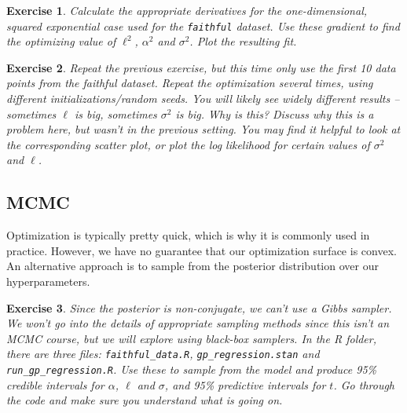 \documentclass[twoside]{article}
\newcounter{lecnum}
\newtheorem{exercise}{Exercise}[lecnum]
\begin{document}
 \begin{exercise}
   Calculate the appropriate derivatives for the one-dimensional, squared exponential case used for the \texttt{faithful} dataset. Use these gradient to find the optimizing value of $\ell^2$, $\alpha^2$ and $\sigma^2$. Plot the resulting fit.
 \end{exercise}


 \begin{exercise}
   Repeat the previous exercise, but this time only use the first 10 data points from the faithful dataset. Repeat the optimization several times, using different initializations/random seeds. You will likely see widely different results -- sometimes $\ell$ is big, sometimes $\sigma^2$ is big. Why is this? Discuss why this is a problem here, but wasn't in the previous setting. You may find it helpful to look at the corresponding scatter plot, or plot the log likelihood for certain values of $\sigma^2$ and $\ell$.
 \end{exercise}
 
 \subsection{MCMC}
 Optimization is typically pretty quick, which is why it is commonly used in practice. However, we have no guarantee that our optimization surface is convex. An alternative approach is to sample from the posterior distribution over our hyperparameters.


 \begin{exercise}
   Since the posterior is non-conjugate, we can't use a Gibbs sampler. We won't go into the details of appropriate sampling methods since this isn't an MCMC course, but we will explore using black-box samplers. In the R folder, there are three files: \texttt{faithful\_data.R}, \texttt{gp\_regression.stan} and \texttt{run\_gp\_regression.R}. Use these to sample from the model and produce 95\% credible intervals for $\alpha$, $\ell$ and $\sigma$, and 95\% predictive intervals for $t$. Go through the code and make sure you understand what is going on.

 \end{exercise}



 



  
  
\end{document}
